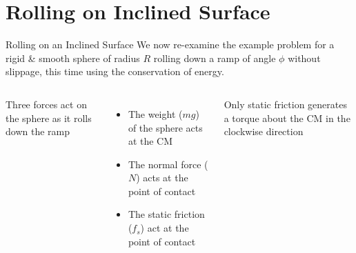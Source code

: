 \documentclass[12pt,compress,aspectratio=169]{beamer}
\begin{document}
%
%  
%
%
%
%
%  
%
%  



\section{Rolling on Inclined Surface}

\begin{frame}{Rolling on an Inclined Surface}
  We now re-examine the example problem for a rigid \& smooth sphere of radius
  $R$ rolling down a ramp of angle  $\phi$ without slippage, this time using
  the conservation of energy.

  \vspace{.2in}
  \begin{columns}
    

    Three forces act on the sphere as it rolls down the ramp
    \begin{itemize}
    \item The weight ($mg$) of the sphere acts at the CM
    \item The normal force ($N$) acts at the point of contact
    \item The static friction ($f_s$) act at the point of contact
    \end{itemize}
    Only static friction generates a torque about the CM in the clockwise
    direction
  \end{columns}
\end{frame}
\end{document}
